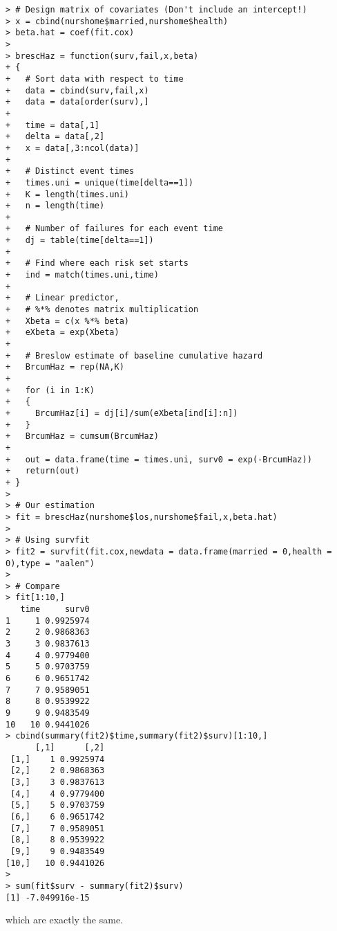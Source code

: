 \begin{enumerate}[(a)]
\begin{enumerate}
\begin{spacing}{1.1}
\begin{footnotesize}
\begin{verbatim}
> # Design matrix of covariates (Don't include an intercept!)
> x = cbind(nurshome$married,nurshome$health)
> beta.hat = coef(fit.cox)
> 
> brescHaz = function(surv,fail,x,beta)
+ {
+   # Sort data with respect to time
+   data = cbind(surv,fail,x)
+   data = data[order(surv),]
+   
+   time = data[,1]
+   delta = data[,2]
+   x = data[,3:ncol(data)]
+   
+   # Distinct event times
+   times.uni = unique(time[delta==1])
+   K = length(times.uni)
+   n = length(time)
+   
+   # Number of failures for each event time
+   dj = table(time[delta==1])
+   
+   # Find where each risk set starts
+   ind = match(times.uni,time)
+   
+   # Linear predictor,
+   # %*% denotes matrix multiplication
+   Xbeta = c(x %*% beta)
+   eXbeta = exp(Xbeta)
+   
+   # Breslow estimate of baseline cumulative hazard
+   BrcumHaz = rep(NA,K)
+   
+   for (i in 1:K)
+   {
+     BrcumHaz[i] = dj[i]/sum(eXbeta[ind[i]:n])
+   }
+   BrcumHaz = cumsum(BrcumHaz)
+   
+   out = data.frame(time = times.uni, surv0 = exp(-BrcumHaz))
+   return(out)
+ }
> 
> # Our estimation
> fit = brescHaz(nurshome$los,nurshome$fail,x,beta.hat)
> 
> # Using survfit
> fit2 = survfit(fit.cox,newdata = data.frame(married = 0,health = 0),type = "aalen")
> 
> # Compare
> fit[1:10,]
   time     surv0
1     1 0.9925974
2     2 0.9868363
3     3 0.9837613
4     4 0.9779400
5     5 0.9703759
6     6 0.9651742
7     7 0.9589051
8     8 0.9539922
9     9 0.9483549
10   10 0.9441026
> cbind(summary(fit2)$time,summary(fit2)$surv)[1:10,]
      [,1]      [,2]
 [1,]    1 0.9925974
 [2,]    2 0.9868363
 [3,]    3 0.9837613
 [4,]    4 0.9779400
 [5,]    5 0.9703759
 [6,]    6 0.9651742
 [7,]    7 0.9589051
 [8,]    8 0.9539922
 [9,]    9 0.9483549
[10,]   10 0.9441026
> 
> sum(fit$surv - summary(fit2)$surv)
[1] -7.049916e-15
\end{verbatim}
\end{footnotesize}
\end{spacing}
which are exactly the same. 
\end{enumerate}
\end{enumerate}






















